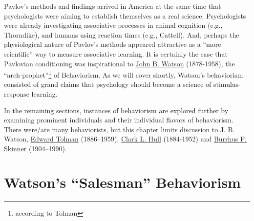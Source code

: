 \documentclass[
  oneside,
  12pt]{crumpbook}
\begin{document}
Pavlov's methods and findings arrived in America at the same time that psychologists were aiming to establish themselves as a real science. Psychologists were already investigating associative processes in animal cognition (e.g., Thorndike), and humans using reaction times (e.g., Cattell). And, perhaps the physiological nature of Pavlov's methods appeared attractive as a ``more scientific'' way to measure associative learning. It is certainly the case that Pavlovian conditioning was inspirational to \href{https://en.wikipedia.org/wiki/John_B._Watson}{John B. Watson} (1878-1958), the ``arch-prophet''\footnote{according to Tolman} of Behaviorism. As we will cover shortly, Watson's behaviorism consisted of grand claims that psychology should become a science of stimulus-response learning.

In the remaining sections, instances of behaviorism are explored further by examining prominent individuals and their individual flavors of behaviorism. There were/are many behaviorists, but this chapter limits discussion to J. B. Watson, \href{https://en.wikipedia.org/wiki/Edward_C._Tolman}{Edward Tolman} (1886--1959), \href{https://en.wikipedia.org/wiki/Clark_L._Hull}{Clark L. Hull} (1884-1952) and \href{https://en.wikipedia.org/wiki/B._F._Skinner}{Burrhus F. Skinner} (1904--1990).

\hypertarget{watsons-salesman-behaviorism}{%
\section{Watson's ``Salesman'' Behaviorism}\label{watsons-salesman-behaviorism}}
\end{document}
